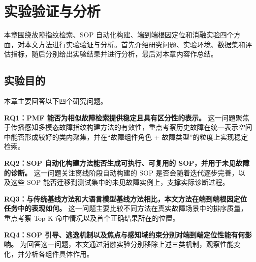 
\chapter{实验验证与分析}

本章围绕故障指纹检索、SOP 自动化构建、端到端根因定位和消融实验四个方面，对本文方法进行实验验证与分析。首先介绍研究问题、实验环境、数据集和评估指标，随后分别给出实验结果并进行分析，最后对本章内容作总结。

\newcommand{\ChapFiveTableHeadColor}{gray!15}
\newcommand{\ChapFiveTableStatColor}{gray!10}
\newcommand{\ChapFiveTableSetup}{%
    \renewcommand{\arraystretch}{1.3}%
    \small%
    \setlength{\tabcolsep}{4.5pt}%
}
\newcommand{\ChapFiveTableNote}[1]{%
    \vspace{0.4em}
    \small\textbf{注：}#1%
}


\section{实验目的}

本章主要回答以下四个研究问题。

\textbf{RQ1：PMF 能否为相似故障检索提供稳定且具有区分性的表示。}
这一问题聚焦于传播感知多模态故障指纹构建方法的有效性，重点考察历史故障在统一表示空间中能否形成较好的类内聚集，并在“故障组件角色 + 故障类型”的粒度上实现稳定检索。

\textbf{RQ2：SOP 自动化构建方法能否生成可执行、可复用的 SOP，并用于未见故障的诊断。}
这一问题关注离线阶段自动构建的 SOP 是否会随着迭代逐步完善，以及这些 SOP 能否迁移到测试集中的未见故障实例上，支撑实际诊断过程。

\textbf{RQ3：与传统基线方法和大语言模型基线方法相比，本文方法在端到端根因定位任务中的表现如何。}
这一问题主要比较不同方法在真实故障场景中的排序质量，重点考察 Top-K 命中情况以及首个正确结果所在的位置。

\textbf{RQ4：SOP 引导、逃逸机制以及焦点与感知域约束分别对端到端定位性能有何影响。}
为回答这一问题，本文通过消融实验分别移除上述三类机制，观察性能变化，并分析各组件具体作用。


